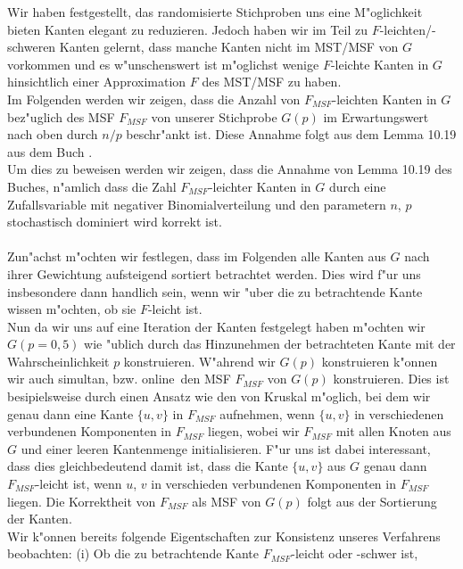 Wir haben festgestellt, das randomisierte Stichproben uns eine M"oglichkeit 
    bieten Kanten elegant zu reduzieren.
    Jedoch haben wir im Teil zu $F$-leichten/-schweren Kanten gelernt, dass
    manche Kanten nicht im MST/MSF von $G$ vorkommen und es w"unschenswert
    ist m"oglichst wenige $F$-leichte Kanten in $G$ hinsichtlich einer 
    Approximation $F$ des MST/MSF zu haben.\\
Im Folgenden werden wir zeigen, dass die Anzahl von $F_{MSF}$-leichten Kanten in $G$ 
    bez"uglich des MSF $F_{MSF}$ von unserer Stichprobe $G(p)$ im Erwartungswert 
    nach oben durch $n/p$ beschr"ankt ist. 
    Diese Annahme folgt aus dem Lemma 10.19 aus dem Buch \cite{randAlg}.\\
Um dies zu beweisen werden wir zeigen, dass die Annahme von Lemma 10.19 des
    Buches, n"amlich dass die Zahl $F_{MSF}$-leichter Kanten in $G$ durch
    eine Zufallsvariable mit negativer Binomialverteilung und den parametern
    $n$, $p$ stochastisch dominiert wird korrekt ist.\\
\\
Zun"achst m"ochten wir festlegen, dass im Folgenden alle Kanten aus $G$ nach 
    ihrer Gewichtung aufsteigend sortiert betrachtet werden.
    Dies wird f"ur uns insbesondere dann handlich sein, wenn wir "uber die zu 
    betrachtende Kante wissen m"ochten, ob sie $F$-leicht ist.\\
Nun da wir uns auf eine Iteration der Kanten festgelegt haben m"ochten wir 
    $G(p=0,5)$ wie "ublich durch das Hinzunehmen der betrachteten Kante mit
    der Wahrscheinlichkeit $p$ konstruieren.
    W"ahrend wir $G(p)$ konstruieren k"onnen wir auch simultan, bzw. 
    \glqq online\grqq\ den MSF $F_{MSF}$ von $G(p)$ konstruieren.
    Dies ist besipielsweise durch einen Ansatz wie den von Kruskal m"oglich, bei
    dem wir genau dann eine Kante $\{u,v\}$ in $F_{MSF}$ aufnehmen, wenn $\{u,v\}$
    in verschiedenen verbundenen Komponenten in $F_{MSF}$ liegen, wobei wir 
    $F_{MSF}$ mit allen Knoten aus $G$ und einer leeren Kantenmenge 
    initialisieren.
    F"ur uns ist dabei interessant, dass dies gleichbedeutend damit ist, dass die Kante 
    $\{u,v\}$
    aus $G$ genau dann $F_{MSF}$-leicht ist, wenn $u$, $v$ in verschieden 
    verbundenen Komponenten in $F_{MSF}$ liegen.
    Die Korrektheit von $F_{MSF}$ als MSF von $G(p)$ folgt aus der Sortierung der Kanten.\\
Wir k"onnen bereits folgende Eigentschaften zur Konsistenz unseres Verfahrens
    beobachten: 
    (i) Ob die zu betrachtende Kante $F_{MSF}$-leicht oder -schwer ist, 
